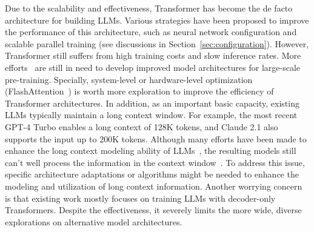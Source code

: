  Due to the scalability and effectiveness, 
Transformer 
has become the de facto architecture for building LLMs. %
Various strategies have been proposed to improve the performance of this architecture, such as  neural network configuration  and scalable parallel  training (see discussions in Section~\ref{sec:configuration}).   
However, Transformer still suffers from  high training  costs and slow inference rates. More efforts~\cite{peng-2023-arxiv-rwkv,sun-2023-arxiv-retnet} are still in need to develop improved model architectures  for large-scale pre-training. 
Specially, system-level or hardware-level optimization (\eg FlashAttention~\cite{Dao-2023-arxiv-flashattention2}) is worth more  exploration to improve the efficiency of Transformer architectures. %
In addition, as an important basic  capacity, existing LLMs typically maintain a long context window. For example, the most recent GPT-4 Turbo enables a long context of  128K tokens, and Claude 2.1 also supports the input up to 200K tokens. Although many efforts have been made to enhance  the long context modeling ability of LLMs~\cite{su-online-2023-Rerope,Press-ICLR-2022-Train}, the resulting models still can't well process the information in the context window~\cite{Liu-arxiv-2023-Lost}. To address this issue, specific architecture adaptations or algorithms might be needed to enhance the modeling and utilization  of long context information.  Another worrying concern is that existing work mostly focuses on training LLMs with decoder-only Transformers. Despite the effectiveness, it severely limits the more wide, diverse explorations on alternative model architectures. 


  



